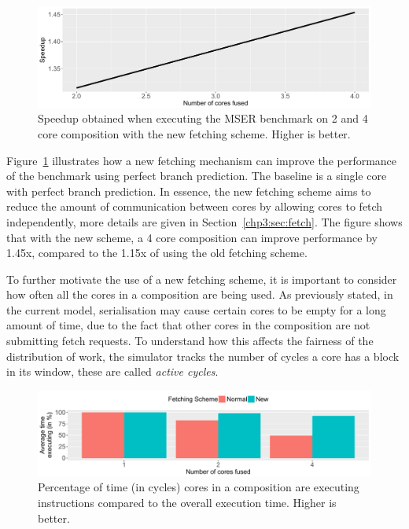 \begin{figure}[t]
    \centering
    \includegraphics[width=1\textwidth]{chapter3/graphics/motiv_mser_fetch.pdf}
    \caption{Speedup obtained when executing the MSER benchmark on 2 and 4 core composition with the new fetching scheme. Higher is better.}
    \label{fig:motivation_fetch}
	\vspace{1em}
\end{figure}

Figure~\ref{fig:motivation_fetch} illustrates how a new fetching mechanism can improve the performance of the  benchmark using perfect branch prediction.
The baseline is a single core with perfect branch prediction.
In essence, the new fetching scheme aims to reduce the amount of communication between cores by allowing cores to fetch independently, more details are given in Section~\ref{chp3:sec:fetch}.
The figure shows that with the new scheme, a 4 core composition can improve performance by 1.45x, compared to the 1.15x of using the old fetching scheme.

To further motivate the use of a new fetching scheme, it is important to consider how often all the cores in a composition are being used.
As previously stated, in the current model, serialisation may cause certain cores to be empty for a long amount of time, due to the fact that other cores in the composition are not submitting fetch requests.
To understand how this affects the fairness of the distribution of work, the simulator tracks the number of cycles a core has a block in its window, these are called \textit{active cycles}.

\begin{figure}[t]
    \centering
    \includegraphics[width=1\textwidth]{chapter3/graphics/fetch_av_time.pdf}
    \caption{Percentage of time (in cycles) cores in a composition are executing instructions compared to the overall execution time. Higher is better.}
    \label{fig:motivation_perc}
	\vspace{1em}
\end{figure}

